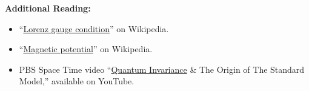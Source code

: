 
{\bf Additional Reading:}
\begin{itemize}
\item ``\href{https://en.wikipedia.org/wiki/Lorenz_gauge_condition}{Lorenz gauge condition}'' on Wikipedia.
\item ``\href{https://en.wikipedia.org/wiki/Magnetic_potential}{Magnetic potential}'' on Wikipedia.
\item PBS Space Time video ``\href{https://youtu.be/V5kgruUjVBs}{Quantum Invariance} \& The Origin of The Standard Model,'' available on YouTube.
\end{itemize}



